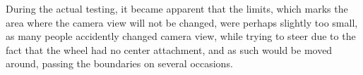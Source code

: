 During the actual testing, it became apparent that the limits, which marks the area where the camera view will not be changed, were perhaps slightly too small, as many people accidently changed camera view, while trying to steer due to the fact that the wheel had no center attachment, and as such would be moved around, passing the boundaries on several occasions.